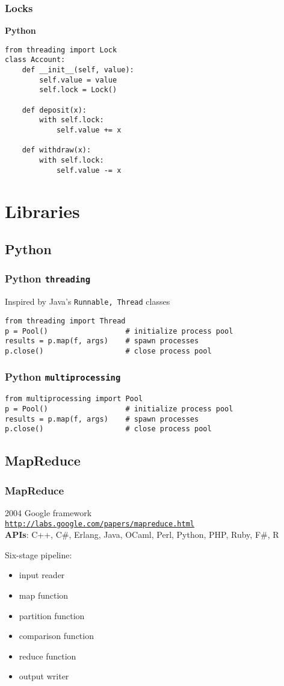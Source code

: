 \documentclass{beamer}
\begin{document}
\begin{frame}[fragile]
\frametitle{Locks}
\textbf{Python}
\begin{verbatim}
from threading import Lock
class Account:
    def __init__(self, value):
        self.value = value
        self.lock = Lock()

    def deposit(x):
        with self.lock:
            self.value += x

    def withdraw(x):
        with self.lock:
            self.value -= x
\end{verbatim}
\end{frame}

\section{Libraries}
\subsection{Python}
\begin{frame}[fragile]
\frametitle{Python \texttt{threading}}
Inspired by Java's \texttt{Runnable, Thread} classes
\begin{verbatim}
from threading import Thread
p = Pool()                  # initialize process pool
results = p.map(f, args)    # spawn processes
p.close()                   # close process pool 
\end{verbatim}
\end{frame}

\begin{frame}[fragile]
\frametitle{Python \texttt{multiprocessing}}
\begin{verbatim}
from multiprocessing import Pool
p = Pool()                  # initialize process pool
results = p.map(f, args)    # spawn processes
p.close()                   # close process pool 
\end{verbatim}
\end{frame}

\subsection{MapReduce}
\begin{frame}
\frametitle{MapReduce}
2004 Google framework\\
\texttt{\url{http://labs.google.com/papers/mapreduce.html}}\\
\textbf{APIs}: C++, C\#, Erlang, Java, OCaml, Perl, Python, PHP, Ruby, F\#, R

Six-stage pipeline:
\begin{itemize}
  \item input reader
  \item map function
  \item partition function
  \item comparison function
  \item reduce function
  \item output writer
\end{itemize}
\end{frame}
\end{document}

